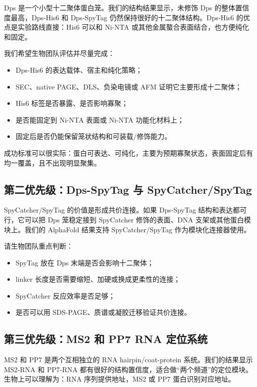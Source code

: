 \documentclass[11pt]{article}
\newcommand{\af}{AlphaFold}
\begin{document}
Dps 是一个小型十二聚体蛋白笼。我们的结构结果显示，未修饰 Dps 的整体置信度最高，Dps-His6 和 Dps-SpyTag 仍然保持很好的十二聚体结构。Dps-His6 的优点是实验路线直接：His6 可以和 Ni-NTA 或其他金属螯合表面结合，也方便纯化和固定。

我们希望生物团队评估并尽量完成：

\begin{itemize}
\item Dps-His6 的表达载体、宿主和纯化策略；
\item SEC、native PAGE、DLS、负染电镜或 AFM 证明它主要形成十二聚体；
\item His6 标签是否暴露、是否影响寡聚；
\item 是否能固定到 Ni-NTA 表面或 Ni-NTA 功能化材料上；
\item 固定后是否仍能保留笼状结构和可装载/修饰能力。
\end{itemize}

成功标准可以很实际：蛋白可表达、可纯化，主要为预期寡聚状态，表面固定后有均一覆盖，且不出现明显聚集。

\subsection{第二优先级：Dps-SpyTag 与 SpyCatcher/SpyTag}

SpyCatcher/SpyTag 的价值是形成共价连接。如果 Dps-SpyTag 结构和表达都可行，它可以把 Dps 笼稳定接到 SpyCatcher 修饰的表面、DNA 支架或其他蛋白模块上。我们的 \af{} 结果支持 SpyCatcher/SpyTag 作为模块化连接器使用。

请生物团队重点判断：

\begin{itemize}
\item SpyTag 放在 Dps 末端是否会影响十二聚体；
\item linker 长度是否需要缩短、加硬或换成更柔性的连接；
\item SpyCatcher 反应效率是否足够；
\item 是否可以用 SDS-PAGE、质谱或凝胶迁移验证共价连接。
\end{itemize}

\subsection{第三优先级：MS2 和 PP7 RNA 定位系统}

MS2 和 PP7 是两个互相独立的 RNA hairpin/coat-protein 系统。我们的结果显示 MS2-RNA 和 PP7-RNA 都有很好的结构置信度，适合做“两个频道”的定位模块。生物上可以理解为：RNA 序列提供地址，MS2 或 PP7 蛋白识别对应地址。
\end{document}
